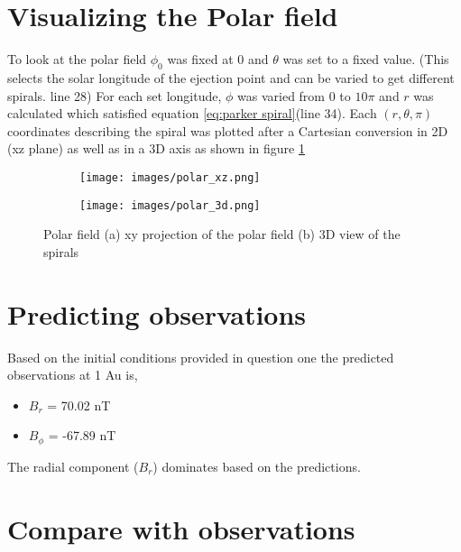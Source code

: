 \documentclass[letterpaper,skipsamekey,12pt,english]{article}
\begin{document}

\hspace{1cm}

\break

\section{Visualizing the Polar field}

To look at the polar field $\phi_0$ was fixed at $0$ and $\theta$ was set to a fixed value. (This selects the solar longitude of the ejection point and can be varied to get different spirals. line 28) For each set longitude, $\phi$ was varied from 0 to $10 \pi$ and $r$  was calculated which satisfied equation \ref{eq:parker spiral}(line 34). Each $(r,\theta,\pi)$ coordinates describing the spiral was plotted after a Cartesian conversion in 2D (xz plane) as well as in a 3D axis as shown in figure \ref{fig:polar_view}

\begin{figure}[h]
\begin{subfigure}{0.5\textwidth}
\texttt{[image: images/polar\_xz.png]} 
\caption{}

\end{subfigure}
\begin{subfigure}{0.5\textwidth}
\texttt{[image: images/polar\_3d.png]}
\caption{}

\end{subfigure}

\caption{Polar field (a) xy projection of the polar field 
     (b) 3D view of the spirals }
 \label{fig:polar_view}
\end{figure}



\section{Predicting observations}

Based on the initial conditions provided in question one the predicted observations at 1 Au is,
\begin{itemize}
    \item $B_r$ = 70.02 nT
    \item $B_\phi$ = -67.89 nT
\end{itemize}
The radial component ($B_r$) dominates based on the predictions.

\section{Compare with observations}
\end{document}
